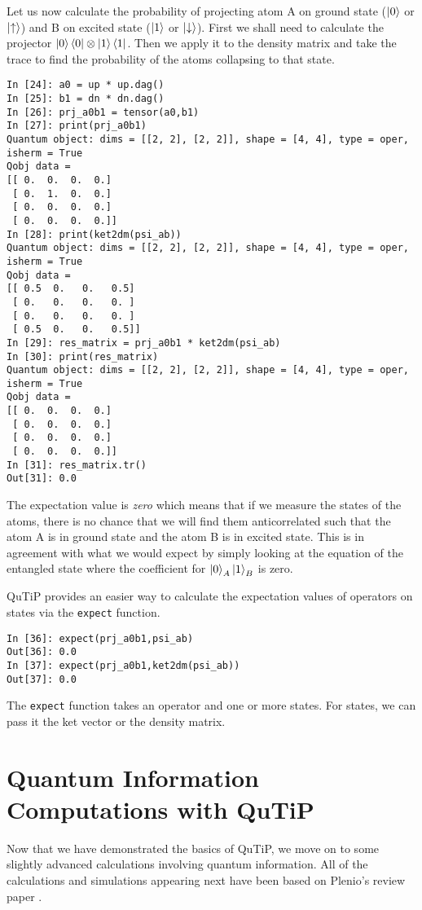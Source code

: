 \par Let us now calculate the probability of projecting atom A on ground state ($\ket{0}$ or $\ket{\uparrow}$) and B on excited state ($\ket{1}$ or $\ket{\downarrow}$). First we shall need to calculate the projector $\ket{0} \bra{0} \otimes \ket{1} \bra{1}$. Then we apply it to the density matrix and take the trace to find the probability of the atoms collapsing to that state.
\begin{verbatim}
In [24]: a0 = up * up.dag()
In [25]: b1 = dn * dn.dag()
In [26]: prj_a0b1 = tensor(a0,b1)
In [27]: print(prj_a0b1)
Quantum object: dims = [[2, 2], [2, 2]], shape = [4, 4], type = oper, 
isherm = True
Qobj data =
[[ 0.  0.  0.  0.]
 [ 0.  1.  0.  0.]
 [ 0.  0.  0.  0.]
 [ 0.  0.  0.  0.]]
In [28]: print(ket2dm(psi_ab))
Quantum object: dims = [[2, 2], [2, 2]], shape = [4, 4], type = oper, 
isherm = True
Qobj data =
[[ 0.5  0.   0.   0.5]
 [ 0.   0.   0.   0. ]
 [ 0.   0.   0.   0. ]
 [ 0.5  0.   0.   0.5]]
In [29]: res_matrix = prj_a0b1 * ket2dm(psi_ab)
In [30]: print(res_matrix)
Quantum object: dims = [[2, 2], [2, 2]], shape = [4, 4], type = oper, 
isherm = True
Qobj data =
[[ 0.  0.  0.  0.]
 [ 0.  0.  0.  0.]
 [ 0.  0.  0.  0.]
 [ 0.  0.  0.  0.]]
In [31]: res_matrix.tr()
Out[31]: 0.0
\end{verbatim}
\par The expectation value is \textit{zero} which means that if we measure the states of the atoms, there is no chance that we will find them anticorrelated such that the atom A is in ground state and the atom B is in excited state. This is in agreement with what we would expect by simply looking at the equation of the entangled state where the coefficient for $\ket{0}_A \ket{1}_B$ is zero.
\par QuTiP provides an easier way to calculate the expectation values of operators on states via the \texttt{expect} function.
\begin{verbatim}
In [36]: expect(prj_a0b1,psi_ab)
Out[36]: 0.0
In [37]: expect(prj_a0b1,ket2dm(psi_ab))
Out[37]: 0.0
\end{verbatim}
The \texttt{expect} function takes an operator and one or more states. For states, we can pass it the ket vector or the density matrix.

\section{Quantum Information Computations with QuTiP}
Now that we have demonstrated the basics of QuTiP, we move on to some slightly advanced calculations involving quantum information. All of the calculations and simulations appearing next have been based on Plenio's review paper \cite{pleniophysforget}.
